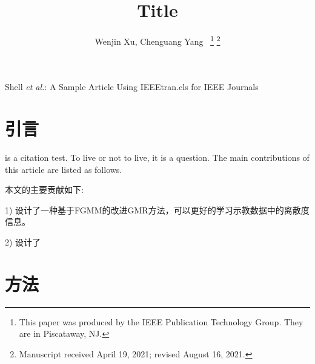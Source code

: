 \documentclass[journal]{IEEEtran}
\begin{document}
\title{Title}
\author{Wenjin Xu, Chenguang Yang~
    \thanks{This paper was produced by the IEEE Publication Technology Group. They are in Piscataway, NJ.}
    \thanks{Manuscript received April 19, 2021; revised August 16, 2021.}}

%
{Shell \MakeLowercase{\textit{et al.}}: A Sample Article Using IEEEtran.cls for IEEE Journals}


\maketitle

\begin{abstract}

\end{abstract}

\begin{IEEEkeywords}

\end{IEEEkeywords}

\section{引言}
 is a citation test. To live or not to live, it is a question\cite{Ju2012,Zhang2005}. The main contributions of this article are listed as follows.

本文的主要贡献如下:

1) 设计了一种基于FGMM的改进GMR方法，可以更好的学习示教数据中的离散度信息。

2) 设计了


\section{方法}







\end{document}
